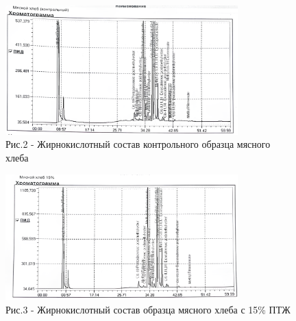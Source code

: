 \begin{figure}[H]
	\centering
	\includegraphics[width=0.8\textwidth]{media/pish2/image73}
	\caption*{Рис.2 - Жирнокислотный состав контрольного образца мясного хлеба}
\end{figure}

\begin{figure}[H]
	\centering
	\includegraphics[width=0.8\textwidth]{media/pish2/image74}
	\caption*{Рис.3 - Жирнокислотный состав образца мясного хлеба с 15\% ПТЖ}
\end{figure}

